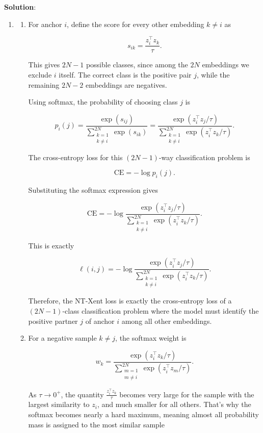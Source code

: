 \documentclass[submit]{harvardml}
\newenvironment{solution}{%
    \vspace{2mm}\color{blue}\noindent\textbf{Solution}:\ }
{}
\begin{document}
\begin{solution}
	\begin{enumerate}
	    \item \begin{enumerate}
	        \item For anchor \(i\), define the score for every other embedding \(k \neq i\) as

\[
s_{ik} = \frac{z_i^\top z_k}{\tau}.
\]

This gives \(2N-1\) possible classes, since among the \(2N\) embeddings we exclude \(i\) itself.
The correct class is the positive pair \(j\), while the remaining \(2N-2\) embeddings are negatives.

Using softmax, the probability of choosing class \(j\) is

\[
p_i(j)
=
\frac{\exp(s_{ij})}
{\sum_{\substack{k=1 \\ k \neq i}}^{2N} \exp(s_{ik})}
=
\frac{\exp\left(z_i^\top z_j/\tau\right)}
{\sum_{\substack{k=1 \\ k \neq i}}^{2N} \exp\left(z_i^\top z_k/\tau\right)}.
\]

The cross-entropy loss for this \((2N-1)\)-way classification problem is

\[
\mathrm{CE}
=
-\log p_i(j).
\]

Substituting the softmax expression gives

\[
\mathrm{CE}
=
-\log
\frac{\exp\left(z_i^\top z_j/\tau\right)}
{\sum_{\substack{k=1 \\ k \neq i}}^{2N}
\exp\left(z_i^\top z_k/\tau\right)}.
\]

This is exactly

\[
\ell(i,j)
=
-\log
\frac{\exp\left(z_i^\top z_j/\tau\right)}
{\sum_{\substack{k=1 \\ k \neq i}}^{2N}
\exp\left(z_i^\top z_k/\tau\right)}.
\]

Therefore, the NT-Xent loss is exactly the cross-entropy loss of a \((2N-1)\)-class classification problem where the model must identify the positive partner \(j\) of anchor \(i\) among all other embeddings.
\item For a negative sample \(k \neq j\), the softmax weight is

\[
w_k
=
\frac{\exp\left(z_i^\top z_k / \tau\right)}
{\sum_{\substack{m=1 \\ m \neq i}}^{2N}
\exp\left(z_i^\top z_m / \tau\right)}.
\]

As \(\tau \to 0^{+}\), the quantity \(\frac{z_i^\top z_k}{\tau}\) becomes very large for the sample with the
largest similarity to \(z_i\), and much smaller for all others. That's why the softmax becomes nearly
a hard maximum, meaning almost all probability mass is assigned to the most similar sample


\end{enumerate}
\end{enumerate}
\end{solution}
\end{document}
